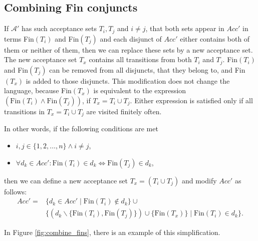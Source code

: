 \documentclass[
  digital, %
  twoside, %
  table,   %
  lof,     %
  lot,     %
]{fithesis3}
\begin{document}
\subsection{Combining Fin conjuncts}
\label{subsec:combine_fins}
If $\mathcal{A'}$ has such acceptance sets $T_i, T_j$ and $i \neq j$, that both sets appear in $Acc'$ in terms Fin$(T_i)$ and Fin$(T_j)$ and each disjunct of $Acc'$ either contains both of them or neither of them, then we can replace these sets by a new acceptance set. The new acceptance set $T_x$ contains all transitions from both $T_i$ and $T_j$. Fin$(T_i)$ and Fin$(T_j)$ can be removed from all disjuncts, that they belong to, and Fin$(T_x)$ is added to those disjuncts. This modification does not change the language, because Fin$(T_x)$ is equivalent to the expression $(\text{Fin}(T_i) \wedge \text{Fin}(T_j))$, if $T_x = T_i \cup T_j$. Either expression is satisfied only if all transitions in $T_x = T_i \cup T_j$ are visited finitely often.

In other words, if the following conditions are met
\begin{itemize}
  \item $i, j \in \{1, 2, \dots, n\} \wedge i \neq j$,
  \item $\forall d_k \in Acc' \colon \text{Fin}(T_i) \in d_k \Leftrightarrow \text{Fin}(T_j) \in d_k$,
\end{itemize}
then we can define a new acceptance set $T_x = (T_i \cup T_j)$ and modify $Acc'$ as follows: 
\begin{align*}
  Acc' =& \{d_k \in Acc' \mid \text{Fin}(T_i) \notin d_k\} \cup \\ &\{(d_k \smallsetminus \{\text{Fin}(T_i), \text{Fin}(T_j)\}) \cup \{\text{Fin}(T_x)\} \mid \text{Fin}(T_i) \in d_k\}.
\end{align*}

In Figure \ref{fig:combine_fins}, there is an example of this simplification.
\end{document}
